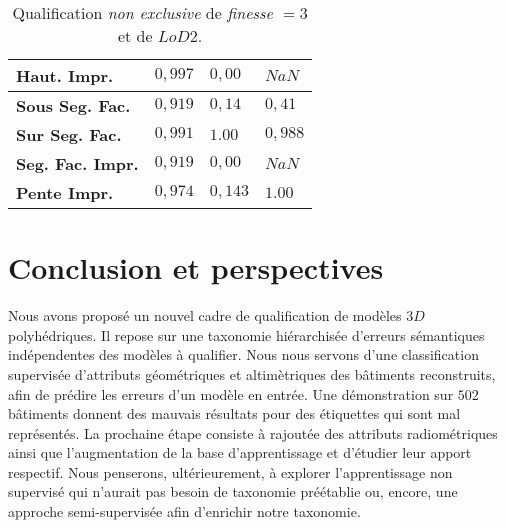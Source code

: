 \documentclass[a4paper,french]{article}
\begin{document}
{\begin{table}[H]
\begin{minipage}{.46\linewidth}
\begin{minipage}{.95\linewidth}
\begin{flushright}
\begin{tabular}{x{2.5cm} x{1cm} x{1cm} x{1cm}}
                            \midrule
                            \textbf{Haut. Impr.} & $0,997$ & $0,00$ & $NaN$ \\
                            \bottomrule
                            \bottomrule
                            \textbf{Sous Seg. Fac.} & $0,919$ & $0,14$ & $0,41$ \\
                            \midrule
                            \textbf{Sur Seg. Fac.} & $0,991$ & $1.00$ & $0,988$ \\
                            \midrule
                            \textbf{Seg. Fac. Impr.} & $0,919$ & $0,00$ & $NaN$\\
                            \midrule
                            \textbf{Pente Impr.} & $0,974$ & $0,143$ & $1.00$\\
                            \bottomrule
                        \end{tabular}
                        \caption{\label{tab::multilab_d3}Qualification \emph{non exclusive} de \emph{finesse} $ = 3$ et de $LoD 2$.}
                    \end{flushright}
                \end{minipage}
            \end{minipage}
        \end{table}
    }

    \section{Conclusion et perspectives}

    Nous avons proposé un nouvel cadre de qualification de modèles $3D$ polyhédriques. Il repose sur une taxonomie hiérarchisée d'erreurs sémantiques indépendentes des modèles à qualifier. Nous nous servons d'une classification supervisée d'attributs géométriques et altimètriques des bâtiments reconstruits, afin de prédire les erreurs d'un modèle en entrée. Une démonstration sur $502$ bâtiments donnent des mauvais résultats pour des étiquettes qui sont mal représentés. La prochaine étape consiste à rajoutée des attributs radiométriques ainsi que l'augmentation de la base d'apprentissage et d'étudier leur apport respectif. Nous penserons, ultérieurement, à explorer l'apprentissage non supervisé qui n'aurait pas besoin de taxonomie préétablie ou, encore, une approche semi-supervisée afin d'enrichir notre taxonomie.

    
    
\end{document}
